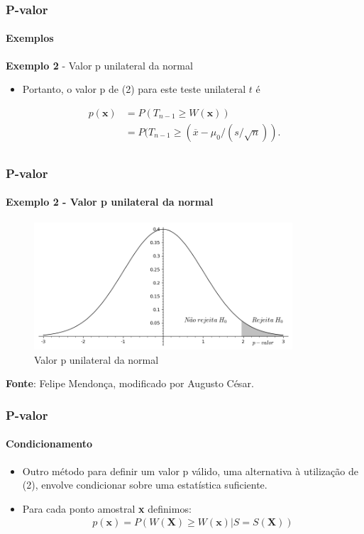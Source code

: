 \begin{frame}[c]
\frametitle{P-valor} 
\framesubtitle{Exemplos}
\begin{exampleblock}{\textbf{Exemplo 2} - Valor p unilateral da normal} %
\begin{itemize}
    \item Portanto, o valor p de (2) para este teste unilateral $t$ é 
\end{itemize}
\begin{align}
    p(\textbf{x})&=P(T_{n-1} \geq  W(\textbf{x})) \nonumber \\  &=P(T_{n-1} \geq (\overline{x}-\mu_{0}/(s/\sqrt{n})). \\ \nonumber
\end{align}
\end{exampleblock}
\end{frame}

\begin{frame}[c] 
\frametitle{P-valor} 
\framesubtitle{Exemplo 2 - Valor p unilateral da normal}
\begin{figure}[h]
    \centering
    \includegraphics[height=4.75cm]{Unilateral.png}
    \caption{Valor p unilateral da normal}
    \label{fig:unilateral}
\end{figure}
\textbf{Fonte}: Felipe Mendonça, modificado por Augusto César.
\end{frame}

\begin{frame}[c] 
\frametitle{P-valor} 
\framesubtitle{Condicionamento}
\begin{itemize}
    \justifying
    \item Outro método para definir um valor p válido, uma alternativa à utilização de (2), envolve condicionar sobre uma estatística suficiente.
    \item Para cada ponto amostral \textbf{x} definimos:
\begin{align}
    p(\textbf{x})=P(W(\textbf{X}) \geq W(\textbf{x})|S=S(\textbf{X}))
\end{align}
\end{itemize}
\end{frame}

